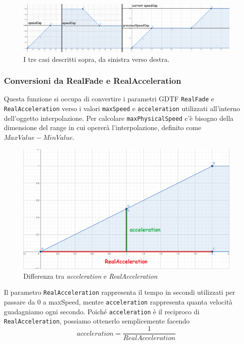 \documentclass[main.tex]{subfiles}
\begin{document}
\begin{figure}[H]
    \centering
    \includegraphics[width=1\linewidth]{img/interpolazione/speedCapThreeCases.png}
    \caption{I tre casi descritti sopra, da sinistra verso destra.}
    \label{fig:4_speedCapThreeCases}
\end{figure}

\clearpage %
\subsubsection{Conversioni da RealFade e RealAcceleration}\label{subsubsec:4_2_Conversions}
Questa funzione si occupa di convertire i parametri GDTF \lstinline{RealFade} e \lstinline{RealAcceleration} verso i valori \lstinline{maxSpeed} e \lstinline{acceleration} utilizzati all'interno dell'oggetto interpolazione. Per calcolare \lstinline{maxPhysicalSpeed} c'è bisogno della dimensione del range in cui opererà l'interpolazione, definito come $MaxValue - MinValue$.\newline

\begin{figure}
    \centering
    \captionsetup{justification=centering}
    \includegraphics[scale=0.3]{img/interpolazione/RealAccelerationVSacceleration.png}
    \caption{Differenza tra \textit{acceleration} e \textit{RealAcceleration}}
    \label{fig:4_RealAccelerationVSacceleration}
\end{figure}
Il parametro \lstinline{RealAcceleration} rappresenta il tempo in secondi utilizzati per passare da 0 a maxSpeed, mentre \lstinline{acceleration} rappresenta quanta velocità guadagniamo ogni secondo. Poiché \lstinline{acceleration} è il reciproco di \lstinline{RealAcceleration}, possiamo ottenerlo semplicemente facendo \[acceleration = \frac{1}{RealAcceleration}\] \newline
\end{document}
